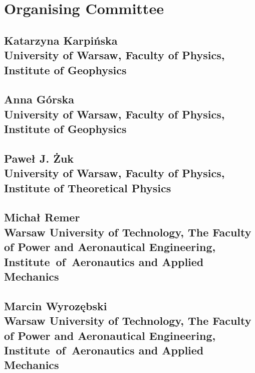 \section*{Organising Committee}

\vspace{.5cm}

\subsection*{Katarzyna Karpińska \\ 
\normalfont University of Warsaw, Faculty of Physics, Institute of Geophysics }

\subsection*{Anna Górska \\
\normalfont University of Warsaw, Faculty of Physics, Institute of Geophysics }

\subsection*{Paweł J. Żuk \\
\normalfont University of Warsaw, Faculty of Physics, Institute of Theoretical Physics }

\subsection*{Michał Remer \\
\normalfont Warsaw University of Technology, The Faculty of Power and Aeronautical Engineering, Institute~of~Aeronautics and Applied Mechanics }

\subsection*{Marcin Wyrozębski \\
\normalfont Warsaw University of Technology, The Faculty of Power and Aeronautical Engineering, Institute~of~Aeronautics and Applied Mechanics}
